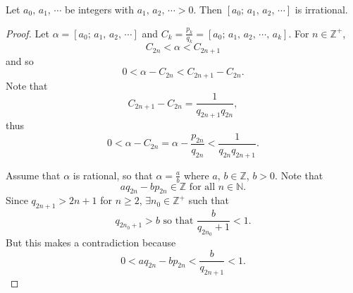 \begin{theorem}
    Let $a_0,\,a_1,\,\cdots$ be integers with $a_1,\,a_2,\,\cdots>0$. Then
    $\left[a_0;\,a_1,\,a_2,\,\cdots\right]$ is irrational.
\end{theorem}

\begin{proof}
    Let $\alpha=\left[a_0;\,a_1,\,a_2,\,\cdots\right]$
    and $C_k=\frac{p_k}{q_k}=\left[a_0;\,a_1,\,a_2,\,\cdots,\,a_k\right]$.
    For $n \in \mathbb{Z}^+$,
    \[
        C_{2n} < \alpha < C_{2n+1}
    \]
    and so
    \[
        0 < \alpha - C_{2n} < C_{2n+1} - C_{2n}.
    \]
    Note that 
    \[
        C_{2n+1}-C_{2n}=\frac{1}{q_{2n+1}q_{2n}},
    \]
    thus
    \[
        0<\alpha-C_{2n}=\alpha-\frac{p_{2n}}{q_{2n}} < \frac{1}{q_{2n}q_{2n+1}}.
    \]
    
    Assume that $\alpha$ is rational, so that $\alpha = \frac{a}{b}$ where
    $a,\,b\in\mathbb{Z}$, $b>0$.
    Note that
    \[
        aq_{2n}-bp_{2n} \in \mathbb{Z} \mbox{ for all }n \in \mathbb{N}.
    \]
    Since $q_{2n+1}>2n+1$ for $n \geq 2$, $\exists n_0\in\mathbb{Z}^+$ such that
    \[
        q_{2n_0+1} > b \mbox{ so that } \frac{b}{q_{2n_0}+1} < 1.
    \]
    But this makes a contradiction because
    \[
        0<aq_{2n}-bp_{2n}<\frac{b}{q_{2n+1}}<1.
    \]
\end{proof}